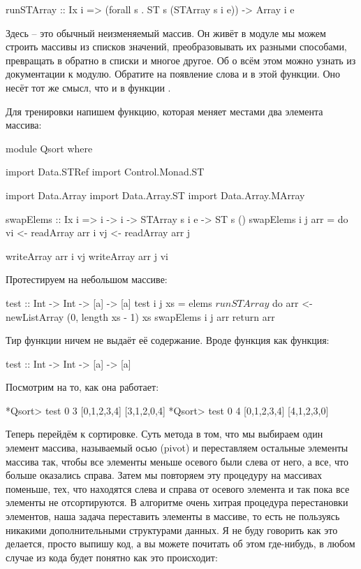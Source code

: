 \begin{code}
runSTArray :: Ix i => (forall s . ST s (STArray s i e)) -> Array i e
\end{code}

Здесь  -- это обычный неизменяемый массив. Он
живёт в модуле  мы можем строить массивы
из списков значений, преобразовывать их разными способами,
превращать в обратно в списки и многое другое.
Об о всём этом можно узнать из документации к модулю. 
Обратите на появление слова  и в этой функции.
Оно несёт тот же смысл, что и в функции .

Для тренировки напишем функцию, которая меняет местами
два элемента массива:

\begin{code}
module Qsort where

import Data.STRef
import Control.Monad.ST

import Data.Array
import Data.Array.ST
import Data.Array.MArray

swapElems :: Ix i => i -> i -> STArray s i e -> ST s ()
swapElems i j arr = do
     vi <- readArray arr i
     vj <- readArray arr j

     writeArray arr i vj
     writeArray arr j vi
\end{code}

Протестируем на небольшом массиве:

\begin{code}
test :: Int -> Int -> [a] -> [a]
test i j xs = elems $ runSTArray $ do
    arr <- newListArray (0, length xs - 1) xs
    swapElems i j arr
    return arr
\end{code}

Тир функции  ничем не выдаёт её содержание.
Вроде функция как функция:

\begin{code}
test :: Int -> Int -> [a] -> [a]
\end{code}

Посмотрим на то, как она работает:

\begin{code}
*Qsort> test 0 3 [0,1,2,3,4]
[3,1,2,0,4]
*Qsort> test 0 4 [0,1,2,3,4]
[4,1,2,3,0]
\end{code}

Теперь перейдём к сортировке. Суть метода в том, что мы выбираем
один элемент массива, называемый осью (pivot) и переставляем
остальные элементы массива так, чтобы все элементы меньше осевого
были слева от него, а все, что больше оказались справа.
Затем мы повторяем эту процедуру на массивах поменьше,
тех, что находятся слева и справа от осевого элемента
и так пока все элементы не отсортируются. В алгоритме 
очень хитрая процедура перестановки элементов, наша
задача переставить элементы в массиве, то есть не пользуясь 
никакими дополнительными структурами данных. 
Я не буду говорить как это делается, просто выпишу код,
а вы можете почитать об этом где-нибудь, в любом случае из 
кода будет понятно как это происходит:

